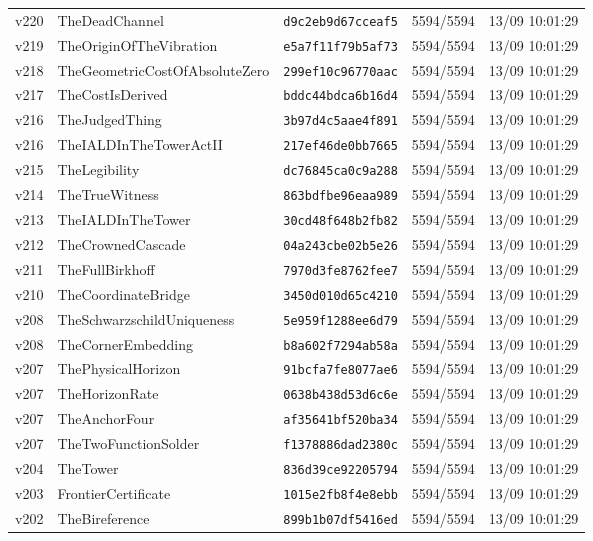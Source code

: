 \documentclass[11pt]{article}
\theoremstyle{definition}\newtheorem{deriv}{Derivation}
\begin{document}
{\begin{longtable}{@{}lllll@{}}
v220 & TheDeadChannel & \texttt{d9c2eb9d67cceaf5} & 5594/5594 & 13/09 10:01:29 \\
v219 & TheOriginOfTheVibration & \texttt{e5a7f11f79b5af73} & 5594/5594 & 13/09 10:01:29 \\
v218 & TheGeometricCostOfAbsoluteZero & \texttt{299ef10c96770aac} & 5594/5594 & 13/09 10:01:29 \\
v217 & TheCostIsDerived & \texttt{bddc44bdca6b16d4} & 5594/5594 & 13/09 10:01:29 \\
v216 & TheJudgedThing & \texttt{3b97d4c5aae4f891} & 5594/5594 & 13/09 10:01:29 \\
v216 & TheIALDInTheTowerActII & \texttt{217ef46de0bb7665} & 5594/5594 & 13/09 10:01:29 \\
v215 & TheLegibility & \texttt{dc76845ca0c9a288} & 5594/5594 & 13/09 10:01:29 \\
v214 & TheTrueWitness & \texttt{863bdfbe96eaa989} & 5594/5594 & 13/09 10:01:29 \\
v213 & TheIALDInTheTower & \texttt{30cd48f648b2fb82} & 5594/5594 & 13/09 10:01:29 \\
v212 & TheCrownedCascade & \texttt{04a243cbe02b5e26} & 5594/5594 & 13/09 10:01:29 \\
v211 & TheFullBirkhoff & \texttt{7970d3fe8762fee7} & 5594/5594 & 13/09 10:01:29 \\
v210 & TheCoordinateBridge & \texttt{3450d010d65c4210} & 5594/5594 & 13/09 10:01:29 \\
v208 & TheSchwarzschildUniqueness & \texttt{5e959f1288ee6d79} & 5594/5594 & 13/09 10:01:29 \\
v208 & TheCornerEmbedding & \texttt{b8a602f7294ab58a} & 5594/5594 & 13/09 10:01:29 \\
v207 & ThePhysicalHorizon & \texttt{91bcfa7fe8077ae6} & 5594/5594 & 13/09 10:01:29 \\
v207 & TheHorizonRate & \texttt{0638b438d53d6c6e} & 5594/5594 & 13/09 10:01:29 \\
v207 & TheAnchorFour & \texttt{af35641bf520ba34} & 5594/5594 & 13/09 10:01:29 \\
v207 & TheTwoFunctionSolder & \texttt{f1378886dad2380c} & 5594/5594 & 13/09 10:01:29 \\
v204 & TheTower & \texttt{836d39ce92205794} & 5594/5594 & 13/09 10:01:29 \\
v203 & FrontierCertificate & \texttt{1015e2fb8f4e8ebb} & 5594/5594 & 13/09 10:01:29 \\
v202 & TheBireference & \texttt{899b1b07df5416ed} & 5594/5594 & 13/09 10:01:29 \\

\end{longtable}}
\end{document}
